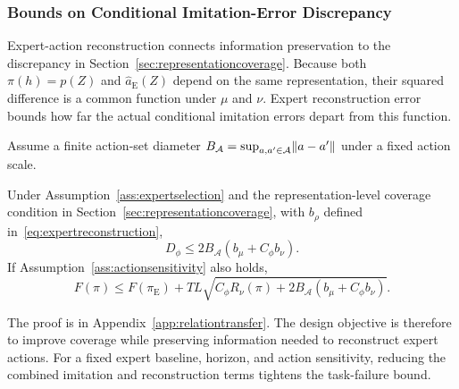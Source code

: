 \subsubsection{Bounds on Conditional Imitation-Error Discrepancy}
\label{sec:relationtransfer}
Expert-action reconstruction connects information preservation to the discrepancy in Section~\ref{sec:representationcoverage}.
Because both $\pi(h)=p(Z)$ and $\widehat a_{\mathrm E}(Z)$ depend on the same representation, their squared difference is a common function under $\mu$ and $\nu$.
Expert reconstruction error bounds how far the actual conditional imitation errors depart from this function.

Assume a finite action-set diameter $B_{\mathcal A}=\sup_{a,a'\in\mathcal A}\lVert a-a'\rVert$ under a fixed action scale.
\begin{proposition}
\label{prop:relationtransfer}
Under Assumption~\ref{ass:expertselection} and the representation-level coverage condition in Section~\ref{sec:representationcoverage}, with $b_\rho$ defined in~\eqref{eq:expertreconstruction},
\begin{equation}
 D_\phi\le 2B_{\mathcal A}(b_\mu+C_\phi b_\nu).
 \label{eq:relationdiscrepancybound}
\end{equation}
If Assumption~\ref{ass:actionsensitivity} also holds,
\begin{equation}
 F(\pi)\le F(\pi_{\mathrm E})
 +TL\sqrt{C_\phi R_\nu(\pi)+2B_{\mathcal A}(b_\mu+C_\phi b_\nu)}.
 \label{eq:relationtransferfailure}
\end{equation}
\end{proposition}
The proof is in Appendix~\ref{app:relationtransfer}.
The design objective is therefore to improve coverage while preserving information needed to reconstruct expert actions.
For a fixed expert baseline, horizon, and action sensitivity, reducing the combined imitation and reconstruction terms tightens the task-failure bound.
